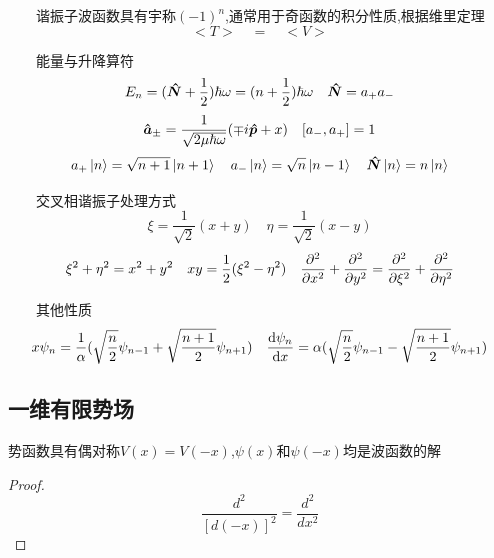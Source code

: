 \documentclass{article}
\begin{document}
\begin{formal}
\begin{enumerate}
                $\qquad$谐振子波函数具有宇称$(-1)^{n}$,通常用于奇函数的积分性质,根据维里定理
                $$  < T > \quad = \quad  < V >  $$
                
                $\qquad$能量与升降算符
                $$ E_{n} = (\vu*{N} + \frac{1}{2}) \hbar \omega = (n + \frac{1}{2}) \hbar \omega   \quad  \vu*{N} = a_{+} a_{-}   $$
                $$ \vu*{a}_{\pm} = \frac{1}{\sqrt{2\mu \hbar \omega}} (\mp i\vu*{p} + x) \quad \comm{\da}{\ua} = 1 $$
                $$ a_{+} \ket{n} = \sqrt{n+1}\ket{n+1} \quad a_{-}\ket{n} = \sqrt{n}\ket{n-1} \quad \vu*{N}\ket{n} = n \ket{n}$$
                
                $\qquad$交叉相谐振子处理方式
                $$ \xi = \frac{1}{\sqrt{2}} (x+y) \quad \eta = \frac{1}{\sqrt{2}} (x -y)  $$
                $$ \xi^{2} + \eta^{2} = x^{2} + y^{2} \quad xy = \frac{1}{2} (\xi^{2} - \eta^{2}) \quad \pdv[2]{x} + \pdv[2]{y} = \pdv[2]{\xi} + \pdv[2]{\eta}$$
                
                $\qquad$其他性质
                $$  
                x \psi_{n} = \frac{1}{\alpha}(\sqrt{\frac{n}{2}}\psi_{n-1} + \sqrt{\frac{n+1}{2}} \psi_{n+1})  \quad 
                \dv{\psi_{n}}{x} = \alpha (\sqrt{\frac{n}{2}}\psi_{n-1} - \sqrt{\frac{n+1}{2}} \psi_{n+1}) 
                $$



                
                

                
            \end{enumerate}
        \end{formal}

        \subsection{一维有限势场}
        \begin{thm}\label{thm:1.1}                                                %
            势函数具有偶对称$V(x)=V(-x)$,$\psi(x)$和$\psi(-x)$均是波函数的解
            
            \begin{proof}
                
                $$ \frac{d^2}{[d(-x)]^2}=\frac{d^2}{dx^2} $$ 

            \end{proof}
        
        \end{thm}
    
\end{document}
